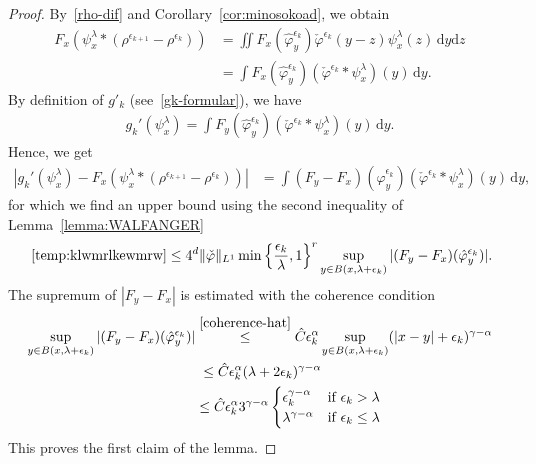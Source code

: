 \begin{itemize}
    \begin{proof}
        By~\eqref{rho-dif} and Corollary~\ref{cor:minosokoad}, we obtain 
        \begin{align*}
            F_x(\psi^\lambda_x * (\rho^{\epsilon_{k+1}} - \rho^{\epsilon_k})) &= \iint F_x(\hat \varphi^{\epsilon_k}_y) \check \varphi^{\epsilon_k}(y-z) \psi^{\lambda}_x(z) \, \mathrm{d}y \mathrm{d}z\\
             &= \int F_x(\hat \varphi^{\epsilon_k}_y) ( \check\varphi^{\epsilon_k} * \psi^{\lambda}_x)(y) \, \mathrm{d}y.
        \end{align*}
        By definition of \(g'_k\) (see~\eqref{gk-formular}), we have 
        \begin{align*}
            g_k'(\psi^\lambda_x) = \int F_y(\hat \varphi^{\epsilon_k}_y) (\check \varphi^{\epsilon_k}* \psi^\lambda_x)(y) \, \mathrm{d}y.
        \end{align*}
        Hence, we get
        \begin{align}\label{temp:klwmrlkewmrw}
            |g_k'(\psi^\lambda_x) - F_x(\psi^\lambda_x * (\rho^{\epsilon_{k+1}} - \rho^{\epsilon_k}))| 
            &= \int (F_y-F_x)(\hat \varphi^{\epsilon_k}_y) (\check \varphi^{\epsilon_k}* \psi^\lambda_x)(y) \, \mathrm{d}y,
        \end{align}
        for which we find an upper bound using the second inequality of Lemma~\ref{lemma:WALFANGER}
        \begin{align*}
           ~\eqref{temp:klwmrlkewmrw} \leq 4^d \lVert \check \varphi \rVert_{L^1} \min \left\{ \frac{\epsilon_k}{\lambda}, 1 \right\}^r \sup_{y \in B(x, \lambda + \epsilon_k)} |(F_y - F_x)(\hat \varphi_y^{\epsilon_k})|.
        \end{align*}
        The supremum of \(|F_y-F_x|\) is estimated with the coherence condition
        \begin{align*}
            \sup_{y \in B(x, \lambda + \epsilon_k)} |(F_y - F_x)(\hat \varphi^{\epsilon_k}_y)| &\overset{\eqref{coherence-hat}}{\leq} \hat C \epsilon_k^{\alpha} \sup_{y \in B(x, \lambda + \epsilon_k)} (|x - y| + \epsilon_k )^{\gamma - \alpha} \\
            &\;\leq \hat C \epsilon^\alpha_k(\lambda + 2\epsilon_k)^{\gamma - \alpha} \\
            &\leq \hat C \epsilon^\alpha_k 3^{\gamma - \alpha} \begin{cases}
                \epsilon_k^{\gamma - \alpha} &\text{if \(\epsilon_k > \lambda\) } \\
                \lambda^{\gamma - \alpha} &\text{if \(\epsilon_k \leq \lambda\) }
            \end{cases}
        \end{align*}
        This proves the first claim of the lemma.


\end{proof}
\end{itemize}
